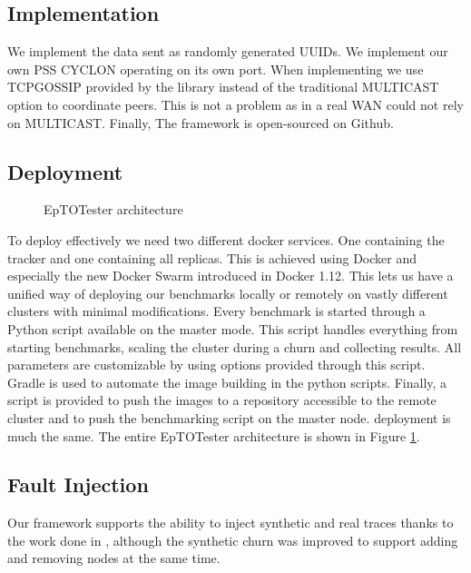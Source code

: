 \subsection{Implementation}
We implement the data sent as randomly generated UUIDs. We implement our own PSS CYCLON operating on its own port. When implementing \jgroups we use TCPGOSSIP provided by the \jgroups library instead of the traditional MULTICAST option to coordinate peers. This is not a problem as in a real WAN \jgroups could not rely on MULTICAST. Finally, The framework is open-sourced on Github.
\subsection{Deployment}
\begin{figure}[htp]
	\centering
	
	\vspace{-2mm} 
	\caption{EpTOTester architecture}
	\vspace{-2mm} 
	\label{fig:complete-architecture}
\end{figure}
To deploy \epto effectively we need two different docker services. One containing the tracker and one containing all \epto replicas. This is achieved using Docker and especially the new Docker Swarm introduced in Docker 1.12. This lets us have a unified way of deploying our benchmarks locally or remotely on vastly different clusters with minimal modifications. Every benchmark is started through a Python script available on the master mode. This script handles everything from starting benchmarks, scaling the cluster during a churn and collecting results. All \epto parameters are customizable by using options provided through this script.
Gradle is used to automate the image building in the python scripts. Finally, a script is provided to push the images to a repository accessible to the remote cluster and to push the benchmarking script on the master node. \jgroups deployment is much the same. The entire EpTOTester architecture is shown in Figure \ref{fig:complete-architecture}. 
\subsection{Fault Injection}
Our framework supports the ability to inject synthetic and real traces thanks to the work done in \autocite{vaucher2016erasure}, although the synthetic churn was improved to support adding and removing nodes at the same time.